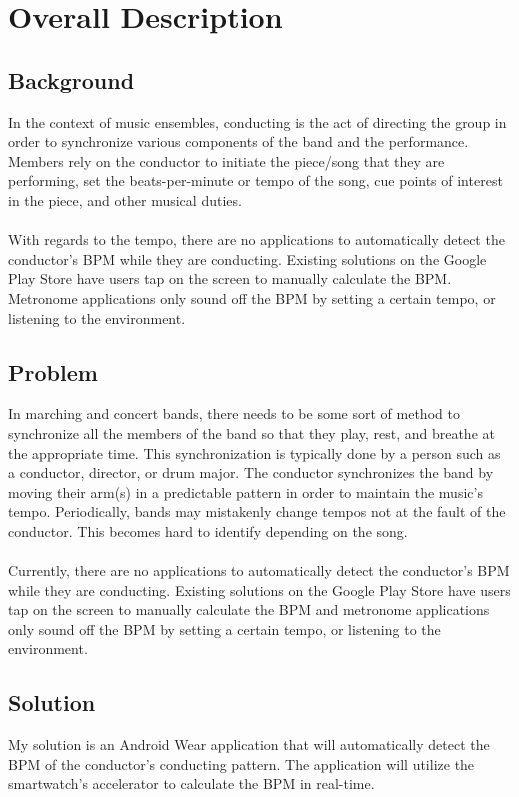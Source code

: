 \documentclass[12pt]{article}
\begin{document}
\section{Overall Description}
\subsection{Background}
In the context of music ensembles, conducting is the act of directing the group in order to synchronize various components of the band and the performance. Members rely on the conductor to initiate the piece/song that they are performing, set the beats-per-minute or tempo of the song, cue points of interest in the piece, and other musical duties. 
\\
\\
With regards to the tempo, there are no applications to automatically detect the conductor's BPM while they are conducting. Existing solutions on the Google Play Store have users tap on the screen to manually calculate the BPM. Metronome applications only sound off the BPM by setting a certain tempo, or listening to the environment.

\subsection{Problem}
In marching and concert bands, there needs to be some sort of method to synchronize all the members of the band so that they play, rest, and breathe at the appropriate time. This synchronization is typically done by a person such as a conductor, director, or drum major. The conductor synchronizes the band by moving their arm(s) in a predictable pattern in order to maintain the music's tempo. Periodically, bands may mistakenly change tempos not at the fault of the conductor. This becomes hard to identify depending on the song.
\\
\\
Currently, there are no applications to automatically detect the conductor's BPM while they are conducting. Existing solutions on the Google Play Store have users tap on the screen to manually calculate the BPM and metronome applications only sound off the BPM by setting a certain tempo, or listening to the environment.  

\subsection{Solution}
My solution is an Android Wear application that will automatically detect the BPM of the conductor's conducting pattern. The application will utilize the smartwatch's accelerator to calculate the BPM in real-time.
\end{document}
